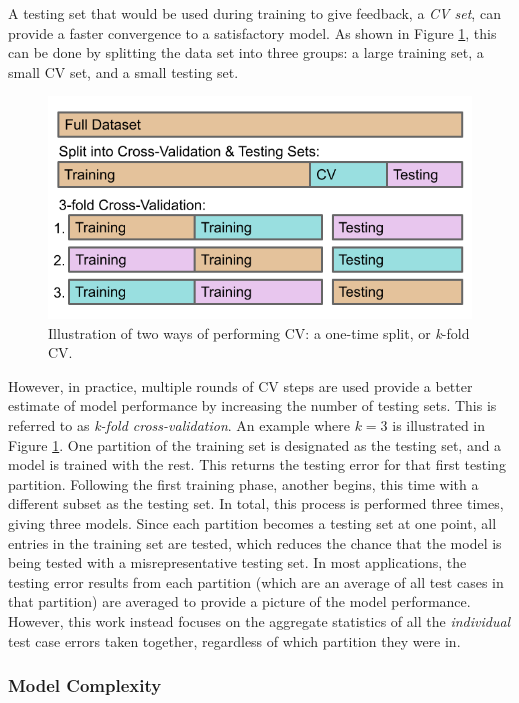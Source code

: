 A testing set that would be used during training to give feedback, a
\textit{\gls{CV} set}, can provide a faster convergence to a satisfactory
model. As shown in Figure \ref{fig:cverror}, this can be done by splitting the
data set into three groups: a large training set, a small \gls{CV} set, and a
small testing set.  

\begin{figure}[!htb]
  \centering
  \includegraphics[width=0.85\linewidth]{./chapters/litrev/cverror.png}
  \caption[Illustration of cross validation]
          {Illustration of two ways of performing \gls{CV}: a one-time split, 
           or \textit{k}-fold \gls{CV}.}
  \label{fig:cverror}
\end{figure}

However, in practice, multiple rounds of \gls{CV} steps are used provide a
better estimate of model performance by increasing the number of testing sets.
This is referred to as \textit{k-fold cross-validation}.  An example where
$k=3$ is illustrated in Figure \ref{fig:cverror}.  One partition of the
training set is designated as the testing set, and a model is trained with the
rest. This returns the testing error for that first testing partition.
Following the first training phase, another begins, this time with a different
subset as the testing set.  In total, this process is performed three times,
giving three models. Since each partition becomes a testing set at one point,
all entries in the training set are tested, which reduces the chance that the
model is being tested with a misrepresentative testing set. In most
applications, the testing error results from each partition (which are an
average of all test cases in that partition) are averaged to provide a picture
of the model performance. However, this work instead focuses on the aggregate
statistics of all the \textit{individual} test case errors taken together,
regardless of which partition they were in.

\subsubsection{Model Complexity}
\label{sec:complexity}

